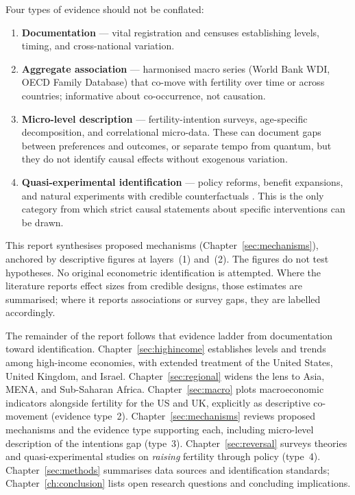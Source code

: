 \documentclass[11pt,a4paper,openany]{book}
\begin{document}
Four types of evidence should not be conflated:
\begin{enumerate}
  \item \textbf{Documentation} --- vital registration and censuses establishing levels, timing, and cross-national variation.
  \item \textbf{Aggregate association} --- harmonised macro series (World Bank WDI, OECD Family Database) that co-move with fertility over time or across countries; informative about co-occurrence, not causation.
  \item \textbf{Micro-level description} --- fertility-intention surveys, age-specific decomposition, and correlational micro-data. These can document gaps between preferences and outcomes, or separate tempo from quantum, but they do not identify causal effects without exogenous variation.
  \item \textbf{Quasi-experimental identification} --- policy reforms, benefit expansions, and natural experiments with credible counterfactuals \citep{milligan2005,doepke2023}. This is the only category from which strict causal statements about specific interventions can be drawn.
\end{enumerate}

This report synthesises proposed mechanisms (Chapter~\ref{sec:mechanisms}), anchored by descriptive figures at layers~(1) and~(2). The figures do not test hypotheses. No original econometric identification is attempted. Where the literature reports effect sizes from credible designs, those estimates are summarised; where it reports associations or survey gaps, they are labelled accordingly.

The remainder of the report follows that evidence ladder from documentation toward identification. Chapter~\ref{sec:highincome} establishes levels and trends among high-income economies, with extended treatment of the United States, United Kingdom, and Israel. Chapter~\ref{sec:regional} widens the lens to Asia, MENA, and Sub-Saharan Africa. Chapter~\ref{sec:macro} plots macroeconomic indicators alongside fertility for the US and UK, explicitly as descriptive co-movement (evidence type~2). Chapter~\ref{sec:mechanisms} reviews proposed mechanisms and the evidence type supporting each, including micro-level description of the intentions gap (type~3). Chapter~\ref{sec:reversal} surveys theories and quasi-experimental studies on \emph{raising} fertility through policy (type~4). Chapter~\ref{sec:methods} summarises data sources and identification standards; Chapter~\ref{ch:conclusion} lists open research questions and concluding implications.
\end{document}
